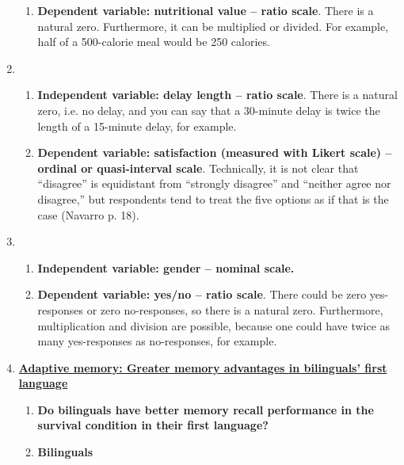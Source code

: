 \documentclass{article}
\begin{document}
\begin{enumerate}
\begin{enumerate}
				\item \textbf{Dependent variable: nutritional value – ratio scale}. There is a natural zero. Furthermore, it can be multiplied or divided. For example, half of a 500-calorie meal would be 250 calories.
				
			\end{enumerate}
		
			\item
			\begin{enumerate}
				\item \textbf{Independent variable: delay length – ratio scale}. There is a natural zero, i.e. no delay, and you can say that a 30-minute delay is twice the length of a 15-minute delay, for example. 
				
				\item \textbf{Dependent variable: satisfaction (measured with Likert scale) – ordinal or quasi-interval scale}. Technically, it is not clear that “disagree” is equidistant from “strongly disagree” and “neither agree nor disagree,” but respondents tend to treat the five options as if that is the case (Navarro p. 18).
			\end{enumerate}
		
			\item
			\begin{enumerate}
				\item \textbf{Independent variable: gender – nominal scale.}
				
				\item \textbf{Dependent variable: yes/no – ratio scale}. There could be zero yes-responses or zero no-responses, so there is a natural zero. Furthermore, multiplication and division are possible, because one could have twice as many yes-responses as no-responses, for example. 
			\end{enumerate}
		
		\item 
		
		\href{https://doi.org/10.1177/13670069211022856}{\textbf{Adaptive memory: Greater memory advantages in bilinguals’ first language}} %
		
		\begin{enumerate}
			\item \textbf{Do bilinguals have better memory recall performance in the survival condition in their first language?}
			
			\item \textbf{Bilinguals} 
			

\end{enumerate}
\end{enumerate}
\end{document}
